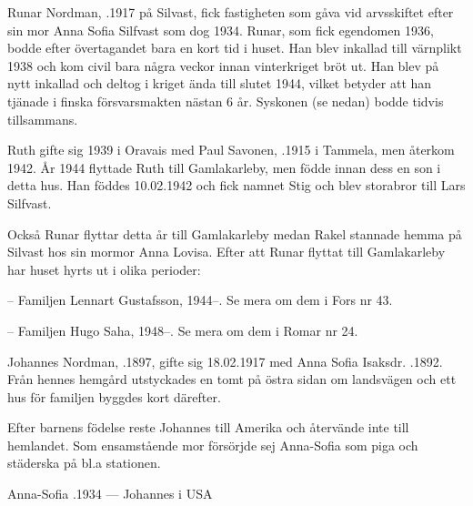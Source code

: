 
%
Runar Nordman, .1917 på Silvast, fick fastigheten som gåva vid arvsskiftet efter sin mor Anna Sofia Silfvast som dog 1934. Runar, som fick egendomen 1936, bodde efter övertagandet bara en kort tid i huset. Han blev inkallad till värnplikt 1938 och kom civil bara några veckor innan vinterkriget bröt ut. Han blev på nytt inkallad och deltog i kriget ända till slutet 1944, vilket betyder att han tjänade i finska försvarsmakten nästan 6 år. Syskonen (se nedan) bodde tidvis tillsammans.

Ruth gifte sig 1939 i Oravais med  Paul Savonen, .1915 i Tammela, men återkom 1942. År 1944 flyttade Ruth till Gamlakarleby, men födde innan dess en son i detta hus. Han föddes 10.02.1942 och fick namnet Stig och blev storabror till Lars Silfvast.

Också Runar flyttar detta år till Gamlakarleby medan Rakel stannade hemma på Silvast hos sin mormor Anna Lovisa. Efter att Runar flyttat till Gamlakarleby har huset hyrts ut i olika perioder:

-- Familjen Lennart Gustafsson, 1944--. Se mera om dem i Fors nr 43.

-- Familjen Hugo Saha, 1948--. Se mera om dem i Romar nr 24.


%
Johannes Nordman, .1897, gifte sig 18.02.1917 med Anna Sofia Isaksdr. .1892. Från hennes hemgård utstyckades en tomt på östra sidan om landsvägen och ett hus för familjen byggdes kort därefter.

Efter barnens födelse reste Johannes till Amerika och återvände inte till hemlandet. Som ensamstående mor försörjde sej Anna-Sofia som piga och städerska på bl.a stationen.
\begin{jhchildren}
  \item {}
  \item {}
  \item {}
\end{jhchildren}

Anna-Sofia .1934  ---  Johannes   i USA



